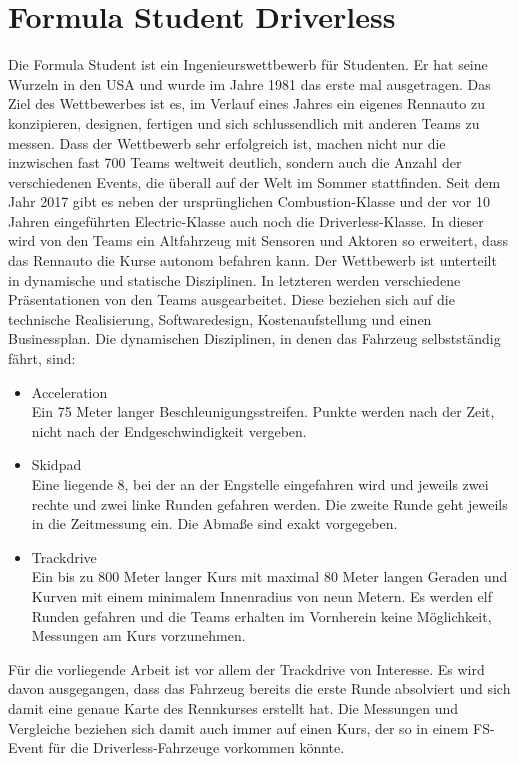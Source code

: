 \documentclass{like}
\begin{document}
\section{Formula Student Driverless}
Die Formula Student ist ein Ingenieurswettbewerb für Studenten. Er hat seine Wurzeln in den USA und wurde im Jahre 1981 das erste mal ausgetragen. Das Ziel des Wettbewerbes ist es, im Verlauf eines Jahres ein eigenes Rennauto zu konzipieren, designen, fertigen und sich schlussendlich mit anderen Teams zu messen. Dass der Wettbewerb sehr erfolgreich ist, machen nicht nur die inzwischen fast 700 Teams weltweit \cite{FsWorldRank:1} deutlich, sondern auch die Anzahl der verschiedenen Events, die überall auf der Welt im Sommer stattfinden. Seit dem Jahr 2017 gibt es neben der ursprünglichen Combustion-Klasse und der vor 10 Jahren eingeführten Electric-Klasse auch noch die Driverless-Klasse.
In dieser wird von den Teams ein Altfahrzeug mit Sensoren und Aktoren so erweitert, dass das Rennauto die Kurse autonom befahren kann.
Der Wettbewerb ist unterteilt in dynamische und statische Disziplinen. In letzteren werden verschiedene Präsentationen von den Teams ausgearbeitet. Diese beziehen sich auf die technische Realisierung, Softwaredesign, Kostenaufstellung und einen Businessplan.
Die dynamischen Disziplinen, in denen das Fahrzeug selbstständig fährt, sind:
\begin{itemize}
	\item Acceleration \\ Ein 75 Meter langer Beschleunigungsstreifen. Punkte werden nach der Zeit, nicht nach der Endgeschwindigkeit vergeben.
	\item Skidpad \\ Eine liegende 8, bei der an der Engstelle eingefahren wird und jeweils zwei rechte und zwei linke Runden gefahren werden. Die zweite Runde geht jeweils in die Zeitmessung ein. Die Abmaße sind exakt vorgegeben.
	\item Trackdrive \\ Ein bis zu 800 Meter langer Kurs mit maximal 80 Meter langen Geraden und Kurven mit einem minimalem Innenradius von neun Metern. Es werden elf Runden gefahren und die Teams erhalten im Vornherein keine Möglichkeit, Messungen am Kurs vorzunehmen.
\end{itemize}

Für die vorliegende Arbeit ist vor allem der Trackdrive von Interesse. Es wird davon ausgegangen, dass das Fahrzeug bereits die erste Runde absolviert und sich damit eine genaue Karte des Rennkurses erstellt hat. Die Messungen und Vergleiche beziehen sich damit auch immer auf einen Kurs, der so in einem \ac{FS}-Event für die Driverless-Fahrzeuge vorkommen könnte.
\end{document}
